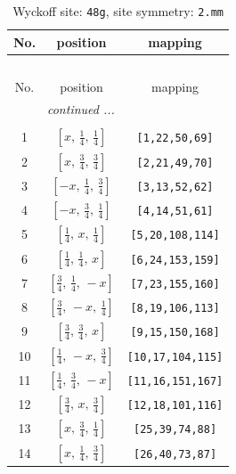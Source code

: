\documentclass[fleqn,8pt]{jsarticle}
\begin{document}
\begin{longtable}{ccc}
\caption{Wyckoff site: {\tt 48g}, site symmetry: {\tt 2.mm}}
 \\
 \hline \hline
No. & position & mapping \\ \hline \endfirsthead

\multicolumn{2}{l}{\tablename\ \thetable{}} \\
 \hline \hline
No. & position & mapping \\ \hline \endhead

 \hline \hline
\multicolumn{2}{r}{\footnotesize\it continued ...} \\ \endfoot

 \hline \hline
\multicolumn{2}{r}{} \\ \endlastfoot

1 & $\left[ x,\, \frac{1}{4},\, \frac{1}{4} \right]$ & {\tt [1,22,50,69]} \\ \hline
2 & $\left[ x,\, \frac{3}{4},\, \frac{3}{4} \right]$ & {\tt [2,21,49,70]} \\ \hline
3 & $\left[ - x,\, \frac{1}{4},\, \frac{3}{4} \right]$ & {\tt [3,13,52,62]} \\ \hline
4 & $\left[ - x,\, \frac{3}{4},\, \frac{1}{4} \right]$ & {\tt [4,14,51,61]} \\ \hline
5 & $\left[ \frac{1}{4},\, x,\, \frac{1}{4} \right]$ & {\tt [5,20,108,114]} \\ \hline
6 & $\left[ \frac{1}{4},\, \frac{1}{4},\, x \right]$ & {\tt [6,24,153,159]} \\ \hline
7 & $\left[ \frac{3}{4},\, \frac{1}{4},\, - x \right]$ & {\tt [7,23,155,160]} \\ \hline
8 & $\left[ \frac{3}{4},\, - x,\, \frac{1}{4} \right]$ & {\tt [8,19,106,113]} \\ \hline
9 & $\left[ \frac{3}{4},\, \frac{3}{4},\, x \right]$ & {\tt [9,15,150,168]} \\ \hline
10 & $\left[ \frac{1}{4},\, - x,\, \frac{3}{4} \right]$ & {\tt [10,17,104,115]} \\ \hline
11 & $\left[ \frac{1}{4},\, \frac{3}{4},\, - x \right]$ & {\tt [11,16,151,167]} \\ \hline
12 & $\left[ \frac{3}{4},\, x,\, \frac{3}{4} \right]$ & {\tt [12,18,101,116]} \\ \hline
13 & $\left[ x,\, \frac{3}{4},\, \frac{1}{4} \right]$ & {\tt [25,39,74,88]} \\ \hline
14 & $\left[ x,\, \frac{1}{4},\, \frac{3}{4} \right]$ & {\tt [26,40,73,87]} \\ \hline

\end{longtable}
\end{document}
